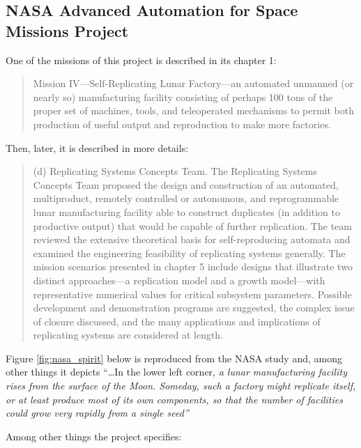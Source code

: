\subsection[NASA Advanced Automation for Space Missions Project]{NASA
Advanced Automation for Space Missions Project}

One of the missions of this
project is described in its chapter 1:

\begin{quote}
Mission IV---Self-Replicating Lunar Factory---an
automated unmanned (or nearly so) manufacturing facility consisting of
perhaps 100 tons of the proper set of machines, tools, and teleoperated
mechanisms to permit both production of useful output and reproduction
to make more factories.
\end{quote}

Then, later, it is described in more details:

\begin{quote}
(d) Replicating Systems Concepts Team. The
Replicating Systems Concepts Team proposed the design and construction
of an automated, multiproduct, remotely controlled or autonomous, and
reprogrammable lunar manufacturing facility able to construct
duplicates (in addition to productive output) that would be capable of
further replication. The team reviewed the extensive theoretical basis
for self-reproducing automata and examined the engineering feasibility
of replicating systems generally. The mission scenarios presented in
chapter 5 include designs that illustrate two distinct approaches---a
replication model and a growth model---with representative numerical
values for critical subsystem parameters. Possible development and
demonstration programs are suggested, the complex issue of closure
discussed, and the many applications and implications of replicating
systems are considered at length.
\end{quote}

Figure \ref{fig:nasa_spirit} below is reproduced from the NASA study and, among other things it
depicts ``{\ldots}In the lower left corner, \textit{a lunar
manufacturing facility rises from the surface of the Moon. Someday,
such a factory might replicate itself, or at least produce most of its
own components, so that the number of facilities could grow very
rapidly from a single seed'' }


Among other things the project specifies:

